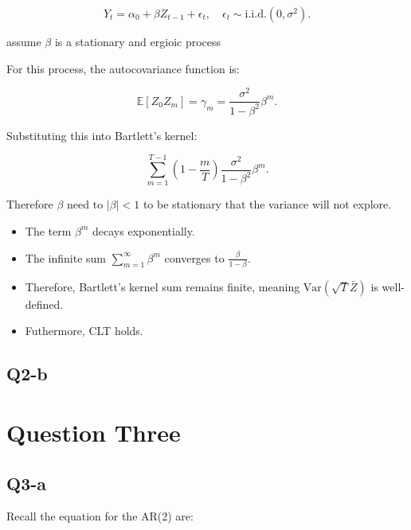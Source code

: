 \documentclass{article} %
\begin{document}
\begin{equation}
    Y_t = \alpha_0 +  \beta Z_{t-1} + \epsilon_t, \quad \epsilon_t \sim \text{i.i.d.} (0, \sigma^2).
\end{equation}

assume $\beta $ is a stationary and ergioic process 


For this process, the autocovariance function is:

\begin{equation}
    \mathbb{E}[Z_0 Z_m] = \gamma_m = \frac{\sigma^2}{1 - \beta^2} \beta^m.
\end{equation}

Substituting this into Bartlett’s kernel:

\begin{equation}
    \sum_{m=1}^{T-1} \left( 1 - \frac{m}{T} \right) \frac{\sigma^2}{1 - \beta^2} \beta^m.
\end{equation}


Therefore  $\beta$ need to  $|\beta| < 1$ to be stationary that the variance will not explore.

\begin{itemize}
    \item The term $\beta^m$ decays exponentially.
    \item The infinite sum $\sum_{m=1}^{\infty} \beta^m$ converges to $\frac{\beta}{1 - \beta}$.
    \item Therefore, Bartlett’s kernel sum remains finite, meaning $\text{Var}(\sqrt{T} \bar{Z})$ is well-defined.
    \item Futhermore,  CLT holds.
\end{itemize}


\subsection{Q2-b}



\section*{Question Three}
\subsection{Q3-a}

Recall the equation for the AR(2) are: 
\end{document}
